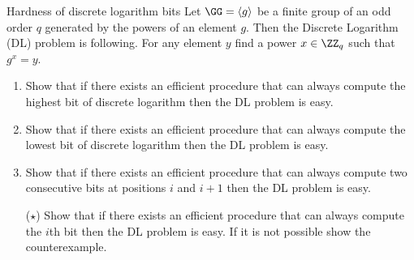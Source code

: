 \documentclass{crypto-exercise}
\author{Sven Laur}
\begin{document}
\begin{exercise}{Hardness of discrete logarithm bits}
  Let $\GG=\langle g\rangle$ be a finite group of an odd order $q$
  generated by the powers of an element $g$. Then the Discrete
  Logarithm (DL) problem is following. For any element $y$ find a
  power $x\in\ZZ_q$ such that $g^x=y$.
  \begin{enumerate}
  \item Show that if there exists an efficient procedure that can
    always compute the highest bit of discrete logarithm then the DL
    problem is easy.
  \item Show that if there exists an efficient procedure that can
    always compute the lowest bit of discrete logarithm then the DL
    problem is easy.
  \item Show that if there exists an efficient procedure that can
    always compute two consecutive bits at positions $i$ and $i+1$ 
    then the DL problem is easy.
  \item[($\star$)] Show that if there exists an efficient procedure
    that can always compute the $i$th bit then the DL problem is
    easy. If it is not possible show the counterexample.
  \end{enumerate} 
\end{exercise}
\end{document}
